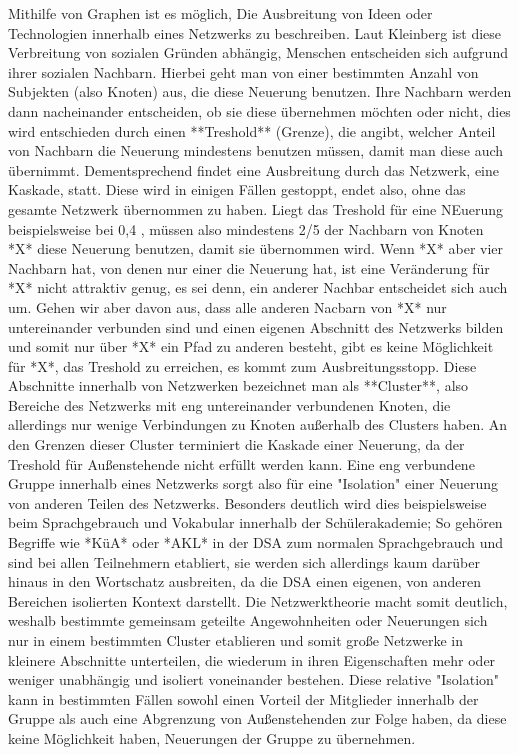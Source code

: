 Mithilfe von Graphen ist es möglich, Die Ausbreitung von Ideen oder Technologien innerhalb eines Netzwerks zu beschreiben.
Laut Kleinberg ist diese Verbreitung von sozialen Gründen abhängig, Menschen entscheiden sich aufgrund ihrer sozialen Nachbarn.
Hierbei geht man von einer bestimmten Anzahl von Subjekten (also Knoten) aus, die diese Neuerung benutzen.
Ihre Nachbarn werden dann nacheinander entscheiden, ob sie diese übernehmen möchten oder nicht, dies wird entschieden durch einen  **Treshold** (Grenze), die angibt, welcher Anteil von Nachbarn die Neuerung mindestens benutzen müssen, damit man diese auch übernimmt.
Dementsprechend findet eine Ausbreitung durch das Netzwerk, eine Kaskade, statt.
Diese wird in einigen Fällen gestoppt, endet also, ohne das gesamte Netzwerk übernommen zu haben.
Liegt das Treshold für eine NEuerung beispielsweise bei 0,4 , müssen also mindestens 2/5 der Nachbarn von Knoten *X* diese Neuerung benutzen, damit sie übernommen wird.
Wenn *X* aber vier Nachbarn hat, von denen nur einer die Neuerung hat, ist eine Veränderung für *X* nicht attraktiv genug, es sei denn, ein anderer Nachbar entscheidet sich auch um.
Gehen wir aber davon aus, dass alle anderen Nacbarn von *X* nur untereinander verbunden sind und einen eigenen Abschnitt des Netzwerks bilden und somit nur über *X* ein Pfad zu anderen besteht, gibt es keine Möglichkeit für *X*, das Treshold zu erreichen, es kommt zum Ausbreitungsstopp.
Diese Abschnitte innerhalb von Netzwerken bezeichnet man als **Cluster**, also Bereiche des Netzwerks mit eng untereinander verbundenen Knoten, die allerdings nur wenige Verbindungen zu Knoten außerhalb des Clusters haben.
An den Grenzen dieser Cluster terminiert die Kaskade einer Neuerung, da der Treshold für Außenstehende nicht erfüllt werden kann.
Eine eng verbundene Gruppe innerhalb eines Netzwerks sorgt also für eine "Isolation" einer Neuerung von anderen Teilen des Netzwerks.
Besonders deutlich wird dies beispielsweise beim Sprachgebrauch und Vokabular innerhalb der Schülerakademie;
So gehören Begriffe wie *KüA* oder *AKL* in der DSA zum normalen Sprachgebrauch und sind bei allen Teilnehmern etabliert, sie werden sich allerdings kaum darüber hinaus in den Wortschatz ausbreiten, da die DSA einen eigenen, von anderen Bereichen isolierten Kontext darstellt.
Die Netzwerktheorie macht somit deutlich, weshalb bestimmte gemeinsam geteilte Angewohnheiten oder Neuerungen sich nur in einem bestimmten Cluster etablieren und somit große Netzwerke in kleinere Abschnitte unterteilen, die wiederum in ihren Eigenschaften mehr oder weniger unabhängig und isoliert voneinander bestehen.
Diese relative "Isolation" kann in bestimmten Fällen sowohl einen Vorteil der Mitglieder innerhalb der Gruppe als auch eine Abgrenzung von Außenstehenden zur Folge haben, da diese keine Möglichkeit haben, Neuerungen der Gruppe zu übernehmen.


